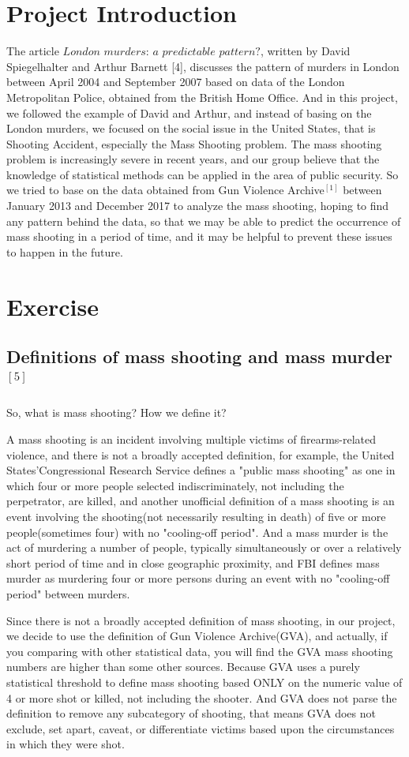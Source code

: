\documentclass[12pt]{article}
\begin{document}
\section{Project Introduction}
The article $London$ $murders$: $a$ $predictable$ $pattern?$, written by David Spiegelhalter and Arthur Barnett [4], discusses the pattern of murders in London between April 2004 and September 2007 based on data of the London Metropolitan Police, obtained from the British Home Office. And in this project, we followed the example of David and Arthur, and instead of basing on the London murders, we focused on the social issue in the United States, that is Shooting Accident, especially the Mass Shooting problem. The mass shooting problem is increasingly severe in recent years, and our group believe that the knowledge of statistical methods can be applied in the area of public security. So we tried to base on the data obtained from Gun Violence Archive$^{[1]}$ between January 2013 and December 2017 to analyze the mass shooting, hoping to find any pattern behind the data, so that we may be able to predict the occurrence of mass shooting in a period of time, and it may be helpful to prevent these issues to happen in the future.
\section{Exercise}
\subsection{Definitions of mass shooting and mass murder$^{[5]}$}
So, what is mass shooting? How we define it?
\par A mass shooting is  an incident involving multiple victims of firearms-related violence, and there is not a broadly accepted definition, for example, the United States'Congressional Research Service defines a "public mass shooting" as one in which four or more people selected indiscriminately, not including the perpetrator, are killed, and another unofficial definition of a mass shooting is an event involving the shooting(not necessarily resulting in death) of five or more people(sometimes four) with no "cooling-off period". And a mass murder is the act of murdering a number of people, typically simultaneously or over a relatively short period of time and in close geographic proximity, and FBI defines mass murder as murdering four or more persons during an event with no "cooling-off period" between murders.
\par Since there is not a broadly accepted definition of mass shooting, in our project, we decide to use the definition of Gun Violence Archive(GVA), and actually, if you comparing with other statistical data, you will find the GVA mass shooting numbers are higher than some other sources. Because GVA uses a purely statistical threshold to define mass shooting based ONLY on the numeric value of 4 or more shot or killed, not including the shooter. And GVA does not parse the definition to remove any subcategory of shooting, that means GVA does not exclude, set apart, caveat, or differentiate victims based upon the circumstances in which they were shot.
\end{document}
